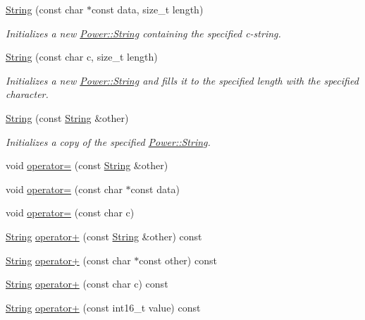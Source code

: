\begin{DoxyCompactItemize}
\hyperlink{class_power_1_1_string_a01efecde6ea0a7f3f37750a4a1b15dcd}{String} (const char $\ast$const data, size\+\_\+t length)
\begin{DoxyCompactList}\small\item\em Initializes a new \hyperlink{class_power_1_1_string}{Power\+::\+String} containing the specified c-\/string. \end{DoxyCompactList}\item 
\hyperlink{class_power_1_1_string_a0ce03af511b7bb4a34b644fd7c9c2455}{String} (const char c, size\+\_\+t length)
\begin{DoxyCompactList}\small\item\em Initializes a new \hyperlink{class_power_1_1_string}{Power\+::\+String} and fills it to the specified length with the specified character. \end{DoxyCompactList}\item 
\hyperlink{class_power_1_1_string_adfe9fa7f75d91211013f408396615d32}{String} (const \hyperlink{class_power_1_1_string}{String} \&other)
\begin{DoxyCompactList}\small\item\em Initializes a copy of the specified \hyperlink{class_power_1_1_string}{Power\+::\+String}. \end{DoxyCompactList}\item 
void \hyperlink{class_power_1_1_string_ac0ec7adf5e627919b560ce591add0644}{operator=} (const \hyperlink{class_power_1_1_string}{String} \&other)
\item 
void \hyperlink{class_power_1_1_string_a80a766af120fe4bb5b7ec18dd97bfacc}{operator=} (const char $\ast$const data)
\item 
void \hyperlink{class_power_1_1_string_afca363999008481eb546192d24f8c9c1}{operator=} (const char c)
\item 
\hyperlink{class_power_1_1_string}{String} \hyperlink{class_power_1_1_string_a570430069e83e0421ccdfb3cddc8a899}{operator+} (const \hyperlink{class_power_1_1_string}{String} \&other) const
\item 
\hyperlink{class_power_1_1_string}{String} \hyperlink{class_power_1_1_string_af34ca6369790db392b8a39e2149e5201}{operator+} (const char $\ast$const other) const
\item 
\hyperlink{class_power_1_1_string}{String} \hyperlink{class_power_1_1_string_ada2da9028cb2a4ebffc585a1da8a942f}{operator+} (const char c) const
\item 
\hyperlink{class_power_1_1_string}{String} \hyperlink{class_power_1_1_string_ad650c3d76fd2ff718f2ee0dd6b9945de}{operator+} (const int16\+\_\+t value) const

\end{DoxyCompactItemize}
